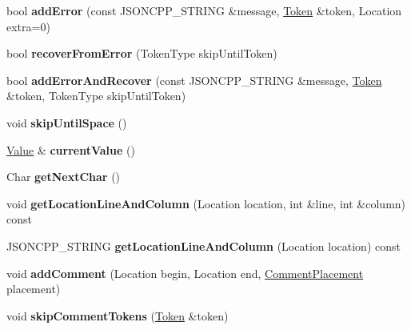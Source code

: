 \begin{DoxyCompactItemize}
\item 
\mbox{\label{classJson_1_1Reader_af02176a1d2786b4415bbb00a1b10bb6b}} 
bool {\bfseries add\+Error} (const J\+S\+O\+N\+C\+P\+P\+\_\+\+S\+T\+R\+I\+NG \&message, \hyperlink{classJson_1_1Reader_1_1Token}{Token} \&token, Location extra=0)
\item 
\mbox{\label{classJson_1_1Reader_a8d4ed03a43082c5ace81ba5b81425eaf}} 
bool {\bfseries recover\+From\+Error} (Token\+Type skip\+Until\+Token)
\item 
\mbox{\label{classJson_1_1Reader_a478db8ac6d00db1409608a37b66bc38d}} 
bool {\bfseries add\+Error\+And\+Recover} (const J\+S\+O\+N\+C\+P\+P\+\_\+\+S\+T\+R\+I\+NG \&message, \hyperlink{classJson_1_1Reader_1_1Token}{Token} \&token, Token\+Type skip\+Until\+Token)
\item 
\mbox{\label{classJson_1_1Reader_ad922ea5a8ab333084edbb84827861fa3}} 
void {\bfseries skip\+Until\+Space} ()
\item 
\mbox{\label{classJson_1_1Reader_a85597f763fb0148a17359b6dfc6f7326}} 
\hyperlink{classJson_1_1Value}{Value} \& {\bfseries current\+Value} ()
\item 
\mbox{\label{classJson_1_1Reader_ab61eb61333cc9ec3afe785663a53ce90}} 
Char {\bfseries get\+Next\+Char} ()
\item 
\mbox{\label{classJson_1_1Reader_a8b2fb6af24382c3914fd4643b092c675}} 
void {\bfseries get\+Location\+Line\+And\+Column} (Location location, int \&line, int \&column) const
\item 
\mbox{\label{classJson_1_1Reader_a49757dec5a1a53eff388dc7bf2bda890}} 
J\+S\+O\+N\+C\+P\+P\+\_\+\+S\+T\+R\+I\+NG {\bfseries get\+Location\+Line\+And\+Column} (Location location) const
\item 
\mbox{\label{classJson_1_1Reader_aaea3bd62d12ffb6117a61476c0685049}} 
void {\bfseries add\+Comment} (Location begin, Location end, \hyperlink{namespaceJson_a4fc417c23905b2ae9e2c47d197a45351}{Comment\+Placement} placement)
\item 
\mbox{\label{classJson_1_1Reader_a22e677ef400d8223f27e631b4cd4b821}} 
void {\bfseries skip\+Comment\+Tokens} (\hyperlink{classJson_1_1Reader_1_1Token}{Token} \&token)
\end{DoxyCompactItemize}
